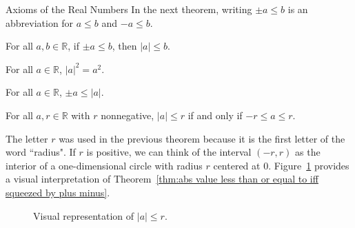 \begin{section}{Axioms of the Real Numbers}
In the next theorem, writing $\pm a\leq b$ is an abbreviation for $a\leq b$ and $-a\leq b$.

\begin{theorem}
For all $a,b\in\mathbb{R}$, if $\pm a\leq b$, then $|a|\leq b$. 
\end{theorem}

\begin{theorem}
For all $a\in\mathbb{R}$, $|a|^2=a^2$.
\end{theorem}

\begin{theorem}\label{thm:plus minus less than or equal to abs value}
For all $a\in\mathbb{R}$, $\pm a\leq |a|$.
\end{theorem}

\begin{theorem}\label{thm:abs value less than or equal to iff squeezed by plus minus}
For all $a,r\in\mathbb{R}$ with $r$ nonnegative, $|a|\leq r$ if and only if $-r\leq a\leq r$.
\end{theorem}

The letter $r$ was used in the previous theorem because it is the first letter of the word ``radius". If $r$ is positive, we can think of the interval $(-r,r)$ as the interior of a one-dimensional circle with radius $r$ centered at 0. Figure~\ref{fig:abs value less than or equal to iff squeezed by plus minus} provides a visual interpretation of Theorem~\ref{thm:abs value less than or equal to iff squeezed by plus minus}.

\begin{figure}[h!]
\centering
{}
\caption{Visual representation of $|a|\leq r$.}\label{fig:abs value less than or equal to iff squeezed by plus minus}
\end{figure}


\end{section}
